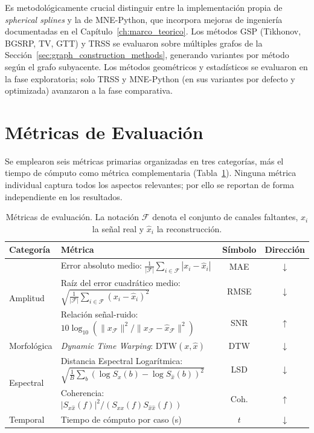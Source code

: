 Es metodológicamente crucial distinguir entre la implementación propia de \textit{spherical splines} y la de MNE-Python, que incorpora mejoras de ingeniería documentadas en el Capítulo~\ref{ch:marco_teorico}. Los métodos GSP (Tikhonov, BGSRP, TV, GTT) y TRSS se evaluaron sobre múltiples grafos de la Sección~\ref{sec:graph_construction_methods}, generando variantes por método según el grafo subyacente. Los métodos geométricos y estadísticos se evaluaron en la fase exploratoria; solo TRSS y MNE-Python (en sus variantes por defecto y optimizada) avanzaron a la fase comparativa.

\section{Métricas de Evaluación}
\label{sec:metricas}

Se emplearon seis métricas primarias organizadas en tres categorías, más el tiempo de cómputo como métrica complementaria (Tabla~\ref{tab:metrics}). Ninguna métrica individual captura todos los aspectos relevantes; por ello se reportan de forma independiente en los resultados.

\begin{table}[htbp]
\centering
\caption{Métricas de evaluación. La notación $\mathcal{F}$ denota el conjunto de canales faltantes, $x_i$ la señal real y $\hat{x}_i$ la reconstrucción.}
\label{tab:metrics}
\footnotesize
\begin{tabular}{@{}p{2.0cm}p{6.7cm}cc@{}}
\toprule
Categoría & Métrica & Símbolo & Dirección \\
\midrule
\multirow{3}{*}{Amplitud} 
& Error absoluto medio: $\frac{1}{|\mathcal{F}|}\sum_{i\in\mathcal{F}}|x_i-\hat{x}_i|$ 
& MAE & $\downarrow$ \\
& Raíz del error cuadrático medio: $\sqrt{\frac{1}{|\mathcal{F}|}\sum_{i\in\mathcal{F}}(x_i-\hat{x}_i)^2}$ 
& RMSE & $\downarrow$ \\
& Relación señal-ruido: $10\log_{10}(\|x_{\mathcal{F}}\|^2/\|x_{\mathcal{F}}-\hat{x}_{\mathcal{F}}\|^2)$ 
& SNR & $\uparrow$ \\
\midrule
Morfológica 
& \textit{Dynamic Time Warping}: $\mathrm{DTW}(x,\hat{x})$ 
& DTW & $\downarrow$ \\
\midrule
\multirow{2}{*}{Espectral} 
& Distancia Espectral Logarítmica: $\sqrt{\frac{1}{B}\sum_b (\log S_x(b)-\log S_{\hat{x}}(b))^2}$ 
& LSD & $\downarrow$ \\
& Coherencia: $|S_{x\hat{x}}(f)|^2/(S_{xx}(f)S_{\hat{x}\hat{x}}(f))$ 
& Coh. & $\uparrow$ \\
\midrule
Temporal & Tiempo de cómputo por caso (s) & $t$ & $\downarrow$ \\
\bottomrule
\end{tabular}
\end{table}

